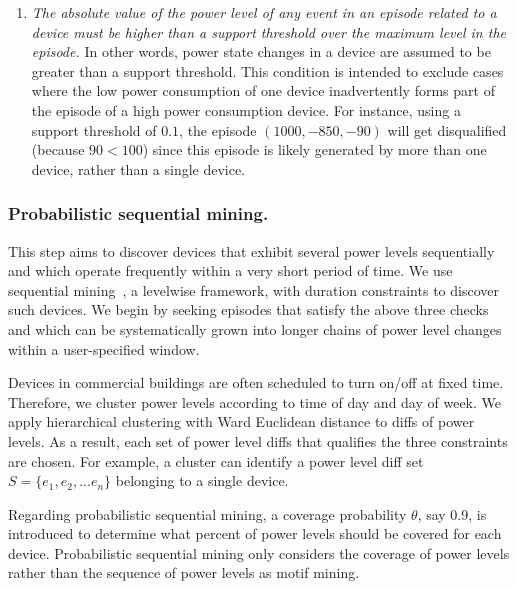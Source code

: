 \begin{enumerate}
\item {\it The absolute value of the power level of any event in an episode
related to a device
must be higher than a support threshold over the maximum level in the
episode.} In other words, power state changes in a device are assumed to be
greater than a support threshold.
This condition is intended to exclude cases where the low power consumption of
one device inadvertently forms part of the episode of a high power consumption
device. For instance, using a support threshold of $0.1$, the episode
$(1000,-850,-90)$ will get disqualified (because $90 < 100$) since
this episode is likely generated by more than one device, rather than
a single device.
\end{enumerate}

\subsubsection*{Probabilistic sequential mining.} This step aims to
discover devices that exhibit several power levels sequentially and which
operate frequently within a very short period of time.
We use sequential mining~\cite{srikant-agrawal}, a levelwise framework,
with duration constraints to discover such devices. We begin
by seeking episodes that satisfy the
above three checks and which can be systematically grown into longer chains
of power level changes within a user-specified window.

Devices in commercial buildings
are often scheduled to turn on/off at fixed time.
Therefore, we cluster power levels according to time of day and
day of week.
We apply hierarchical clustering with Ward Euclidean distance
to diffs of power levels.
As a result, each set of power level diffs
that qualifies the three constraints are chosen.
For example, a cluster can identify a power level diff set $S=\{e_1, e_2, ...e_n\}$
belonging to a single device.

Regarding probabilistic sequential mining,
a coverage probability $\theta$, say 0.9, is introduced
to determine what percent of power levels
should be covered for each device.
Probabilistic sequential mining only considers the
coverage of power levels rather than
the sequence of power levels as motif mining.


